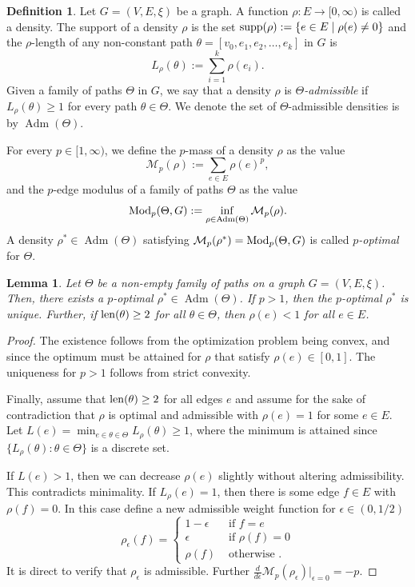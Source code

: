\documentclass{amsart}
\newcommand{\len}{{\rm len}}
\newcommand{\Mod}{{\rm Mod}}
\newcommand{\supp}{{\rm supp}}
\newcommand{\Adm}{\operatorname{Adm}}
\newtheorem{lemma}[equation]{Lemma}
\numberwithin{equation}{section}
\theoremstyle{definition}
\newtheorem{definition}[equation]{Definition}
\theoremstyle{remark}
\newcommand{\cM}{\mathcal{M}}
\begin{document}
\begin{definition}\label{def: edgemodulus1}
    Let \(G=(V,E,\xi)\) be a graph. A function \(\rho\colon E\to [0,\infty)\) is called a density. The support of a density \(\rho\) is the set \(\supp(\rho):=\{e\in E\mid \rho(e)\neq 0\}\) and the \(\rho\)-length of any non-constant path \(\theta=[v_0,e_1,e_2,\dots,e_k]\) in \(G\) is
        \[
            L_\rho(\theta):=\sum_{i=1}^{k}\rho(e_i).
        \]
    Given a family of paths \(\Theta\) in \(G\), we say that a density \(\rho\) is \emph{\(\Theta\)-admissible} if \(L_\rho(\theta)\geq 1\) for every path \(\theta\in \Theta\). We denote the set of \(\Theta\)-admissible densities is by \(\Adm(\Theta)\). 
    
    For every \(p\in [1,\infty)\), we define the \(p\)-mass of a density \(\rho\) as the value
        \[
            \cM_p(\rho):=\sum_{e\in E}\rho(e)^p,
        \]
    and the \(p\)-edge modulus of a family of paths \(\Theta\) as the value
        \[
            \Mod_p(\Theta,G):=\inf_{\rho\in \Adm(\Theta)} \cM_p(\rho).
        \]
    A density \(\rho^*\in\Adm(\Theta)\) satisfying \(\cM_p(\rho^*)=\Mod_p(\Theta,G)\) is called \emph{\(p\)-optimal} for \(\Theta\).
\end{definition}

\begin{lemma}\label{Lemma: Existence of Minimizers}
    Let \(\Theta\) be a non-empty family of paths on a graph \(G=(V,E,\xi)\). Then, there exists a $p$-optimal $\rho^*\in\Adm(\Theta)$. If \(p>1\), then the $p$-optimal $\rho^*$ is unique. Further,  if \(\len(\theta)\geq 2\) for all \(\theta\in\Theta\), then \(\rho(e)<1\) for all \(e\in E\).
\end{lemma}


\begin{proof}
The existence follows from the optimization problem being convex, and since the optimum must be attained for $\rho$ that satisfy $\rho(e)\in [0,1]$. The uniqueness for $p>1$ follows from strict convexity.

Finally, assume that $\len(\theta)\geq 2$ for all edges $e$ and assume for the sake of contradiction that $\rho$ is optimal and admissible with $\rho(e)=1$ for some $e\in E$. Let $L(e)=\min_{e\in \theta\in \Theta} L_{\rho}(\theta)\geq 1$, where the minimum is attained since $\{L_\rho(\theta) : \theta\in \Theta\}$ is a discrete set. 

If $L(e)>1$, then we can decrease $\rho(e)$ slightly without altering admissibility. This contradicts minimality. If $L_\rho(e)=1$, then there is some edge $f\in E$ with $\rho(f)=0$. In this case define a new admissible weight function for $\epsilon \in (0,1/2)$
\[
\rho_\epsilon(f)=\begin{cases} 1-\epsilon & \text{ if  } f=e \\
\epsilon & \text{ if  } \rho(f)=0 \\
\rho(f) & \text{ otherwise }. \end{cases}
\]
It is direct to verify that $\rho_\epsilon$ is admissible. Further $\frac{d}{d\epsilon} \cM_p(\rho_\epsilon)|_{\epsilon = 0} = -p$.
\end{proof}
\end{document}
